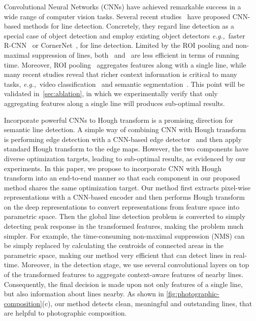 \documentclass[10pt,journal,cspaper,compsoc]{IEEEtran}
\def\eg{\emph{e.g.,~}}
\begin{document}
Convolutional Neural Networks (CNNs) have achieved remarkable success in a wide range of computer vision tasks.
%
Several recent studies~\cite{lee2017semantic,zhang2019ppgnet} have proposed CNN-based methods for line detection.
%
Concretely, they regard line detection as a special case of object detection and employ existing object detectors
\eg faster R-CNN~\cite{ren2015faster} or CornerNet~\cite{law2018cornernet},
for line detection.
%
Limited by the ROI pooling and non-maximal suppression of lines,
both~\cite{lee2017semantic} and~\cite{zhang2019ppgnet} are less efficient in terms of
running time.
%
%
Moreover, ROI pooling~\cite{girshick2015fast} aggregates features along with a
single line, while many recent studies reveal that richer context information is critical to many
tasks, \eg video classification~\cite{wang2018non} and semantic segmentation~\cite{huang2019ccnet}.
%
This point will be validated in~\cref{sec:ablation}, in which we experimentally verify that only aggregating features along a single line will produces sub-optimal results.

Incorporate powerful CNNs to Hough transform is a promising direction for
semantic line detection.
%
A simple way of combining CNN with Hough transform is performing edge detection 
with a CNN-based edge detector~\cite{RcfEdgePami2019,xie2015holistically}
and then apply standard Hough transform to the edge maps.
%
However, the two components have diverse optimization targets, leading to sub-optimal results, as
evidenced by our experiments.
%
In this paper, we propose to incorporate CNN with Hough transform into an end-to-end manner
so that each component in our proposed method shares the same optimization target.
%
Our method first extracts pixel-wise representations with a CNN-based encoder
and then performs Hough transform on the deep representations to convert representations
from feature space into parametric space.
%
Then the global line detection problem is converted to simply detecting peak response in
the transformed features, making the problem much simpler.
%
For example, the time-consuming non-maximal suppression (NMS) can be simply
replaced by calculating the centroids of connected areas in the parametric space, 
making our method very efficient that can detect lines in real-time.
%
Moreover, in the detection stage, we use several convolutional layers on
top of the transformed features to aggregate context-aware features of nearby lines.
%
Consequently, the final decision is made upon not only features of a single line,
but also information about lines nearby.
%
As shown in \cref{fig:photographic-composition}(c), 
our method detects clean, meaningful and outstanding lines,
that are helpful to photographic composition.
\end{document}
